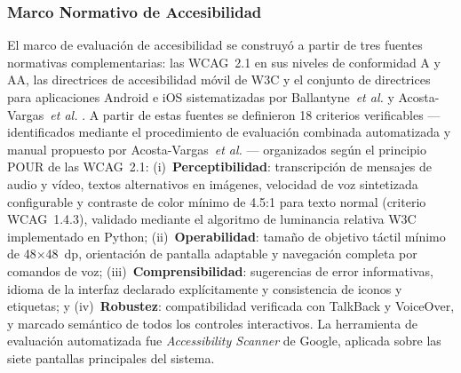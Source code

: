 \documentclass[journal]{IEEEtran}
\begin{document}
	\subsubsection{Marco Normativo de Accesibilidad}
	El marco de evaluaci\'on de accesibilidad se construy\'o a partir de tres fuentes normativas complementarias: las WCAG~2.1 \cite{w3c2018} en sus niveles de conformidad A y AA, las directrices de accesibilidad m\'ovil de W3C y el conjunto de directrices para aplicaciones Android e iOS sistematizadas por Ballantyne~\textit{et al.} \cite{ballantyne2018} y Acosta-Vargas~\textit{et al.} \cite{acosta2021}. A partir de estas fuentes se definieron 18 criterios verificables ---identificados mediante el procedimiento de evaluaci\'on combinada automatizada y manual propuesto por Acosta-Vargas~\textit{et al.} \cite{acosta2021}--- organizados seg\'un el principio POUR de las WCAG~2.1: (i)~\textbf{Perceptibilidad}: transcripci\'on de mensajes de audio y v\'ideo, textos alternativos en im\'agenes, velocidad de voz sintetizada configurable y contraste de color m\'inimo de 4.5:1 para texto normal (criterio WCAG~1.4.3), validado mediante el algoritmo de luminancia relativa W3C implementado en Python; (ii)~\textbf{Operabilidad}: tama\~no de objetivo t\'actil m\'inimo de 48$\times$48~dp, orientaci\'on de pantalla adaptable y navegaci\'on completa por comandos de voz; (iii)~\textbf{Comprensibilidad}: sugerencias de error informativas, idioma de la interfaz declarado expl\'icitamente y consistencia de iconos y etiquetas; y (iv)~\textbf{Robustez}: compatibilidad verificada con TalkBack y VoiceOver, y marcado sem\'antico de todos los controles interactivos. La herramienta de evaluaci\'on automatizada fue \textit{Accessibility Scanner} de Google, aplicada sobre las siete pantallas principales del sistema.
	
\end{document}
